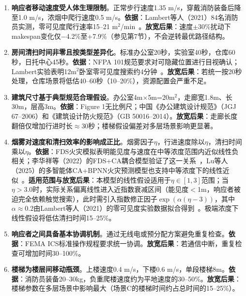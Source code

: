 \documentclass[12pt,a4paper]{ctexart}
\begin{document}
\begin{enumerate}[label=\textbf{A\arabic*:}, leftmargin=*, itemsep=4pt]

    \item \textbf{响应者移动速度受人体生理限制}。正常步行速度1.35 m/s，穿戴消防装备后降至1.0 m/s，浓烟中爬行速度0.5 m/s。\textbf{依据}：Lambert等人（2021）84名消防员实测，零可见度爬行速率15--21 $\text{m}^2$/min~\cite{lambert2021searchrescue}。\textbf{放宽后果}：速度$\pm$30\%扰动下makespan变化仅$-$4.2\%至$+$7.9\%（参见第7节），不会逆转最优路径结构。

    \item \textbf{房间清扫时间非零且按类型差异化}。标准办公室20秒，实验室40秒，仓库60秒，日托中心45秒。\textbf{依据}：NFPA 101规范要求对可隐藏位置进行目视确认；Lambert实验表明12$\text{m}^2$卧室零可见度搜索约4分钟~\cite{lambert2021searchrescue}。\textbf{放宽后果}：若统一按20秒处理，仓库场景将低估40--60秒（10--20\%），资源配置会严重不足。

    \item \textbf{建筑尺寸基于典型规范合理假设}。办公室4m$\times$5m=20$\text{m}^2$，走廊宽1.8m、长30m，层高3m。\textbf{依据}：Figure 1无比例尺；中国《办公建筑设计规范》（JGJ 67--2006）和《建筑设计防火规范》（GB 50016--2014）。\textbf{放宽后果}：走廊长度翻倍仅增加行进时长$\approx$30秒；楼梯假设偏差对多层场景影响更显著。

    \item \textbf{烟雾对速度和清扫效率的影响成正比}。烟雾因子$\eta$，行进速度除以$\eta$，清扫时间乘以$\eta$。\textbf{依据}：FDS火灾模拟表明能见度与速度在中等浓度范围内近似线性负相关；李华祥等（2022）的FDS+CA耦合模型验证了这一关系~\cite{li2022fdsca}，Lu等人（2025）的多智能体CA+BPNN火灾预测模型也支持中等浓度下的线性近似~\cite{lu2025multiagent}。\textbf{适用范围与放宽后果}：本模型的线性假设适用于$\eta\in[1,3]$范围；当$\eta>3.0$时，实际关系偏离线性进入近指数衰减区间（能见度$<$1m，响应者被迫完全依赖触觉搜索），此时需引入指数修正因子$\exp(\alpha(\eta-3))$，其中$\alpha\approx 0.2$由Lambert等人（2021）的零可见度实验数据拟合得到~\cite{lambert2021searchrescue}。极端浓度下线性假设将低估清扫时间15--25\%。

    \item \textbf{响应者之间具备基本协调机制}。通过无线电或预分配方案避免重复检查。\textbf{依据}：FEMA ICS标准操作规程要求统一协调。\textbf{放宽后果}：若通信中断，重复检查可增加时间30--100\%。

    \item \textbf{楼梯为楼层间移动瓶颈}。上楼速度0.4 m/s，下楼0.6 m/s，单段楼梯8m。\textbf{依据}：消防员装备20--30kg，负重爬楼速度约为平地速度的30--50\%。\textbf{放宽后果}：楼梯参数在多层场景中影响最大（场景C的楼梯时间约占总时间的15--25\%）。

\end{enumerate}
\end{document}
